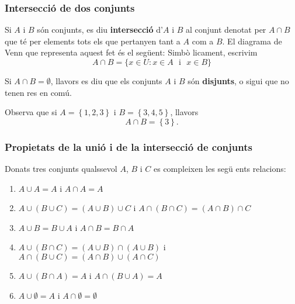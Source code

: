 \subsubsection{Intersecci\'{o} de dos conjunts}

Si $A$ i $B$ s\'{o}n conjunts, es diu \textbf{intersecci\'{o}} d'$A$ i $B$
al conjunt denotat per $A\cap B$ que t\'{e} per elements tots els que
pertanyen tant a $A$ com a $B$. El diagrama de Venn que representa aquest
fet \'{e}s el seg\"{u}ent:  Simb\`{o}%
licament, escrivim%
\begin{equation*}
A\cap B=\{x\in U:x\in A\text{ ~i~ }x\in B\}
\end{equation*}

Si $A\cap B=\emptyset$, llavors es diu que els conjunts $A$ i $B$ s\'{o}n
\textbf{disjunts}, o sigui que no tenen res en com\'{u}.

\begin{exemple}
Observa que si $A=\left\{ 1,2,3\right\} $ i $B=\left\{ 3,4,5\right\} $,
llavors%
\begin{equation*}
A\cap B=\left\{ 3\right\} \text{.}
\end{equation*}
\end{exemple}

\subsubsection{Propietats de la uni\'{o} i de la intersecci\'{o} de conjunts}

Donats tres conjunts qualssevol $A$, $B$ i $C$ es compleixen les seg\"{u}%
ents relacions:

\begin{enumerate}
\item $A\cup A=A$ i $A\cap A=A$

\item $A\cup(B\cup C)=(A\cup B)\cup C$ i $A\cap(B\cap C)=(A\cap B)\cap C$

\item $A\cup B=B\cup A$ i $A\cap B=B\cap A$

\item $A\cup(B\cap C)=(A\cup B)\cap(A\cup B)$ i $A\cap(B\cup C)=(A\cap
B)\cup(A\cap C)$

\item $A\cup(B\cap A)=A$ i $A\cap(B\cup A)=A$

\item $A\cup\emptyset=A$ i $A\cap\emptyset=\emptyset$
\end{enumerate}

